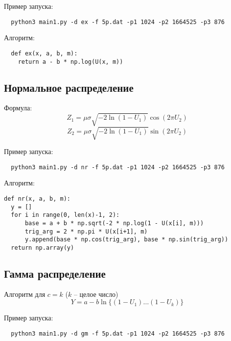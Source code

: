 \documentclass[spec, och, labwork]{shiza}
\begin{document}
Пример запуска:
\begin{small}
\begin{verbatim}
  python3 main1.py -d ex -f 5p.dat -p1 1024 -p2 1664525 -p3 876  
 \end{verbatim}
\end{small}

Алгоритм:
\begin{small}
\begin{verbatim}
  def ex(x, a, b, m):
    return a - b * np.log(U(x, m))
\end{verbatim}
\end{small}


\subsection{Нормальное распределение}

Формула:
\[ Z_1 = \mu \sigma \sqrt{-2 \ln(1 - U_1)} \cos(2 \pi U_2) \]
\[ Z_2 = \mu \sigma \sqrt{-2 \ln(1 - U_1)} \sin(2 \pi U_2) \]

Пример запуска:
\begin{small}
\begin{verbatim}
  python3 main1.py -d nr -f 5p.dat -p1 1024 -p2 1664525 -p3 876  
 \end{verbatim}
\end{small}

Алгоритм:
\begin{small}
\begin{verbatim}
def nr(x, a, b, m):
  y = []
  for i in range(0, len(x)-1, 2):
      base = a + b * np.sqrt(-2 * np.log(1 - U(x[i], m)))
      trig_arg = 2 * np.pi * U(x[i+1], m)
      y.append(base * np.cos(trig_arg), base * np.sin(trig_arg))
  return np.array(y)
\end{verbatim}
\end{small}


\subsection{Гамма распределение}

Алгоритм для $c = k$ ($k$ -- целое число)
\[ Y = a - b \ln \{(1 - U_1) \dots (1 - U_k)\} \]

Пример запуска:
\begin{small}
\begin{verbatim}
  python3 main1.py -d gm -f 5p.dat -p1 1024 -p2 1664525 -p3 876   
 \end{verbatim}
\end{small}
\end{document}
